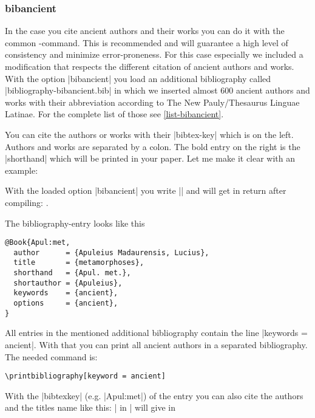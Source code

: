 \documentclass[a4paper,
10pt,
greek,
french,
spanish,
italian,
ngerman,
english
]{ltxdoc}
\begin{document}
\subsubsection{bibancient}\label{bibancient}
In the case you cite ancient authors and their works you can do it with the common  -command.
This is recommended and will  guarantee a high level of consistency and  minimize  error-proneness.
For this case especially we included a modification that respects the different citation of  ancient authors and works.
With the option |bibancient| you load an additional bibliography called |bibliography-bibancient.bib| in which we inserted almost 600 ancient authors and works with their abbreviation according to The New Pauly/Thesaurus Linguae Latinae.
For the complete list of those see  \cref{list-bibancient}.

You can cite the authors or works with their |bibtex-key| which is on the left. 
Authors and works are separated by a colon.
The bold entry on the right is the |shorthand| which will be printed in your paper.
Let me make it clear with an example:
\begin{refsection}
With the loaded option |bibancient| you write  
|\cite[3,2,5--7]{Apul:met}|  %
and will get in return after compiling: \cite[3,2,5--7]{Apul:met}.
\end{refsection}
The bibliography-entry looks like this
 \begin{lstlisting}[style=bibentry,label=Apul:met,caption={{@}Book\{Apul:met,…\} }]
@Book{Apul:met,
  author      = {Apuleius Madaurensis, Lucius},
  title       = {metamorphoses},
  shorthand   = {Apul. met.},
  shortauthor = {Apuleius},
  keywords    = {ancient},
  options     = {ancient},
}
\end{lstlisting}
All entries in the mentioned additional bibliography contain the line |keywords = {ancient}|.
With that you can print all ancient authors in a separated bibliography.
The needed command is:
\begin{lstlisting}
\printbibliography[keyword = ancient]
\end{lstlisting}

\begin{refsection}
With the  |bibtexkey| (e.g. |Apul:met|) of the entry you can also cite the authors and the titles name 
like this: 
|\citeauthor{Apul:met} in | will give 
\citeauthor{Apul:met} in 
\end{refsection}
\end{document}
